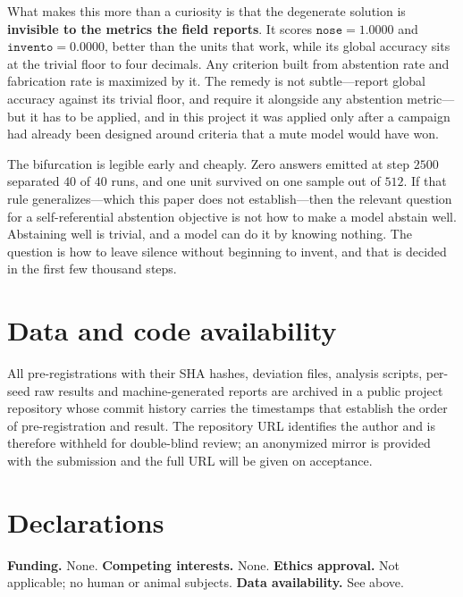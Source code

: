 \documentclass[11pt]{article}
\begin{document}
What makes this more than a curiosity is that the degenerate solution is \textbf{invisible to the
metrics the field reports}. It scores $\texttt{nose} = 1.0000$ and $\texttt{invento} = 0.0000$,
better than the units that work, while its global accuracy sits at the trivial floor to four decimals.
Any criterion built from abstention rate and fabrication rate is maximized by it. The remedy is not
subtle---report global accuracy against its trivial floor, and require it alongside any abstention
metric---but it has to be applied, and in this project it was applied only after a campaign had
already been designed around criteria that a mute model would have won.

The bifurcation is legible early and cheaply. Zero answers emitted at step $2500$ separated $40$ of
$40$ runs, and one unit survived on one sample out of $512$. If that rule generalizes---which this
paper does not establish---then the relevant question for a self-referential abstention objective is
not how to make a model abstain well. Abstaining well is trivial, and a model can do it by knowing
nothing. The question is how to leave silence without beginning to invent, and that is decided in the
first few thousand steps.

\section*{Data and code availability}

All pre-registrations with their SHA hashes, deviation files, analysis scripts, per-seed raw results
and machine-generated reports are archived in a public project repository whose commit history
carries the timestamps that establish the order of pre-registration and result. The repository URL
identifies the author and is therefore withheld for double-blind review; an anonymized mirror is
provided with the submission and the full URL will be given on acceptance.

\section*{Declarations}

\textbf{Funding.} None. \textbf{Competing interests.} None. \textbf{Ethics approval.} Not applicable;
no human or animal subjects. \textbf{Data availability.} See above.
\end{document}
